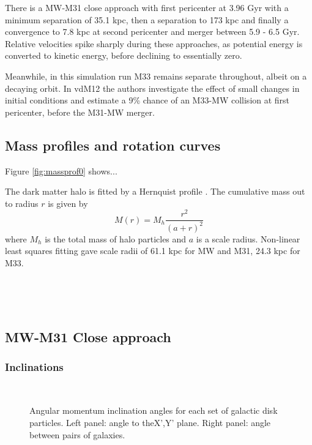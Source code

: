\documentclass[twocolumn]{aastex63}
\newcommand{\todo}{\color{red}{TODO}\color{black}\hspace{2mm}}
\begin{document}
There is a MW-M31 close approach with first pericenter at 3.96 Gyr with a minimum separation of 35.1 kpc, then a separation to 173 kpc and finally a convergence to 7.8 kpc at second pericenter and merger between 5.9 - 6.5 Gyr. Relative velocities spike sharply during these approaches, as potential energy is converted to kinetic energy, before declining to essentially zero.

Meanwhile, in this simulation run M33 remains separate throughout, albeit on a decaying orbit. In vdM12 the authors investigate the effect of small changes in initial conditions and estimate a 9\% chance of an M33-MW collision at first pericenter, before the M31-MW merger.

\subsection{Mass profiles and rotation curves}

Figure \ref{fig:massprof0} shows... \todo{set xlim, make y axis log}\ 

The dark matter halo is fitted by a Hernquist profile \citep{hernquist_analytical_1990}. The cumulative mass out to radius $r$ is given by
\[ M(r) = M_h \frac{r^2}{(a+r)^2} \]
where $M_h$ is the total mass of halo particles and $a$ is a scale radius. Non-linear least squares fitting gave scale radii of 61.1 kpc for MW and M31, 24.3 kpc for M33.

\todo{identify the bar?}\ 

\todo{sersic profiles at various stages?}\ 



\subsection{MW-M31 Close approach}

\subsubsection{Inclinations}

\todo{Relative rotation axes of disks}\ 

\begin{figure*}[ht!]
	\caption{Angular momentum inclination angles for each set of galactic disk particles. Left panel: angle to theX',Y' plane. Right panel: angle between pairs of galaxies.
		\label{fig:inclinations}}
\end{figure*}
\end{document}
